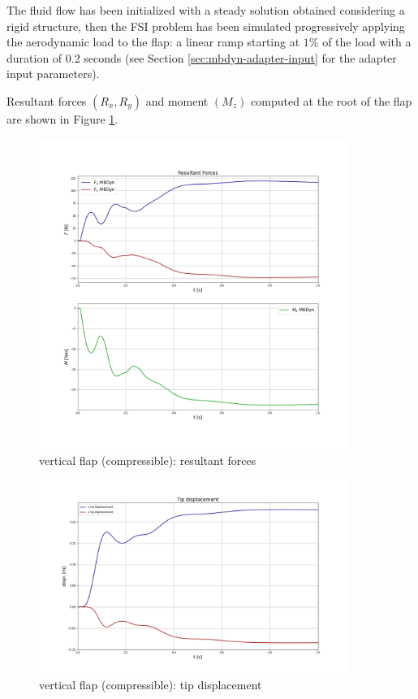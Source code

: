 The fluid flow has been initialized with a steady solution obtained considering a rigid structure, then the FSI problem has been simulated progressively applying the aerodynamic load to the flap: a linear ramp starting at $1\%$ of the load with a duration of 0.2 seconds (see Section \ref{sec:mbdyn-adapter-input} for the adapter input parameters).

Resultant forces $(R_x, R_y)$ and moment $(M_z)$ computed at the root of the flap are shown in Figure \ref{fig:comp_force}.

\begin{figure}[htbp!]
	\centering
	\includegraphics[width=0.9\textwidth, trim=0 100 0 100, clip]{images/comp_flap/forces_comp.png}
	\caption{vertical flap (compressible): resultant forces}
	\label{fig:comp_force}
\end{figure}



\begin{figure}[htbp!]
	\centering
	\includegraphics[width=0.9\textwidth, trim=0 50 0 50, clip]{images/comp_flap/disp_comp.png}
	\caption{vertical flap (compressible): tip displacement}
	\label{fig:comp_displacement}
\end{figure}


